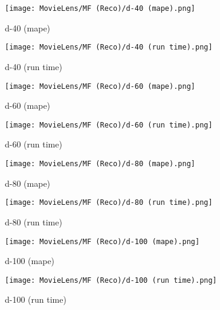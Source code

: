 \documentclass[12pt]{article}
\begin{document}
\begin{figure}[H]
\centering
    \begin{minipage}{0.45\textwidth}
        \centering
        \texttt{[image: MovieLens/MF (Reco)/d-40 (mape).png]}
        \caption{d-40 (mape)}
        
    \end{minipage}\hfill
    \begin{minipage}{0.45\textwidth}
        \centering
        \texttt{[image: MovieLens/MF (Reco)/d-40 (run time).png]}
        \caption{d-40 (run time)}
    \end{minipage}
\end{figure}

\begin{figure}[H]
\centering
    \begin{minipage}{0.45\textwidth}
        \centering
        \texttt{[image: MovieLens/MF (Reco)/d-60 (mape).png]}
        \caption{d-60 (mape)}
        
    \end{minipage}\hfill
    \begin{minipage}{0.45\textwidth}
        \centering
        \texttt{[image: MovieLens/MF (Reco)/d-60 (run time).png]}
        \caption{d-60 (run time)}
    \end{minipage}
\end{figure}

\begin{figure}[H]
\centering
    \begin{minipage}{0.45\textwidth}
        \centering
        \texttt{[image: MovieLens/MF (Reco)/d-80 (mape).png]}
        \caption{d-80 (mape)}
        
    \end{minipage}\hfill
    \begin{minipage}{0.45\textwidth}
        \centering
        \texttt{[image: MovieLens/MF (Reco)/d-80 (run time).png]}
        \caption{d-80 (run time)}
    \end{minipage}
\end{figure}

\begin{figure}[H]
\centering
    \begin{minipage}{0.45\textwidth}
        \centering
        \texttt{[image: MovieLens/MF (Reco)/d-100 (mape).png]}
        \caption{d-100 (mape)}
        
    \end{minipage}\hfill
    \begin{minipage}{0.45\textwidth}
        \centering
        \texttt{[image: MovieLens/MF (Reco)/d-100 (run time).png]}
        \caption{d-100 (run time)}
    \end{minipage}
\end{figure}
\end{document}
